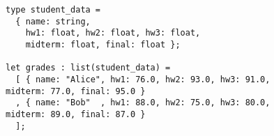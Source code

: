 \begin{figure}[t]

\begin{lstlisting}
type student_data =
  { name: string, 
    hw1: float, hw2: float, hw3: float, 
    midterm: float, final: float };

let grades : list(student_data) =
  [ { name: "Alice", hw1: 76.0, hw2: 93.0, hw3: 91.0, midterm: 77.0, final: 95.0 }
  , { name: "Bob"  , hw1: 88.0, hw2: 75.0, hw3: 80.0, midterm: 89.0, final: 87.0 }
  ];
\end{lstlisting}


\caption{}
\label{fig:grades-example}
\end{figure}
